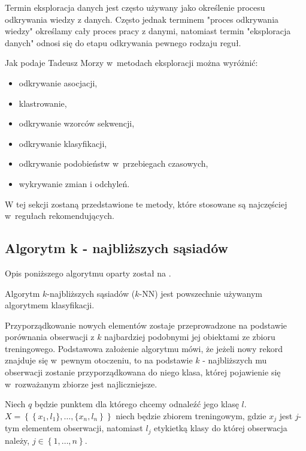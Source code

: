 \documentclass[12pt,a4paper]{report}
\newcommand{\set}[1]{\left\lbrace {#1} \right\rbrace}
\begin{document}
Termin eksploracja danych jest często używany jako określenie procesu odkrywania wiedzy z danych. Często jednak terminem  "proces odkrywania wiedzy" określamy cały proces pracy z danymi, natomiast termin "eksploracja danych" odnosi się do etapu odkrywania pewnego rodzaju reguł.

Jak podaje Tadeusz Morzy \citep{edmia} w~metodach eksploracji można wyróżnić:
\begin{itemize}
\item odkrywanie asocjacji,
\item klastrowanie,
\item odkrywanie wzorców sekwencji,
\item odkrywanie klasyfikacji,
\item odkrywanie podobieństw w~przebiegach czasowych,
\item wykrywanie zmian i odchyleń.
\end{itemize}

W tej sekcji zostaną przedstawione te metody, które stosowane są najczęściej w~regułach rekomendujących.


\subsection{Algorytm k - najbliższych sąsiadów }
Opis poniższego algorytmu oparty został na {\citep[Sec 2.3.1]{rsh}}.

Algorytm $k$-najbliższych sąsiadów ($k$-NN) jest powszechnie używanym algorytmem klasyfikacji.
 
Przyporządkowanie nowych elementów zostaje przeprowadzone na podstawie porównania obserwacji z $k$ najbardziej podobnymi jej obiektami ze zbioru treningowego. Podstawowa założenie algorytmu mówi, że jeżeli nowy rekord znajduje się w~pewnym otoczeniu, to na podstawie $k$ - najbliższych mu obserwacji zostanie przyporządkowana do niego klasa, której pojawienie się w~rozważanym zbiorze jest najliczniejsze.

Niech $q$ będzie punktem dla którego chcemy odnaleźć jego klasę $l$. 
\\$\mathit{X}=\set{\set{x_1,l_1\},\ldots,\{x_n,l_n}}$ niech będzie zbiorem treningowym, gdzie $x_j$ jest $j$-tym elementem obserwacji, natomiast $l_j$ etykietką klasy do której obserwacja należy, $j\in\set{1,\ldots,n}$.
\end{document}
